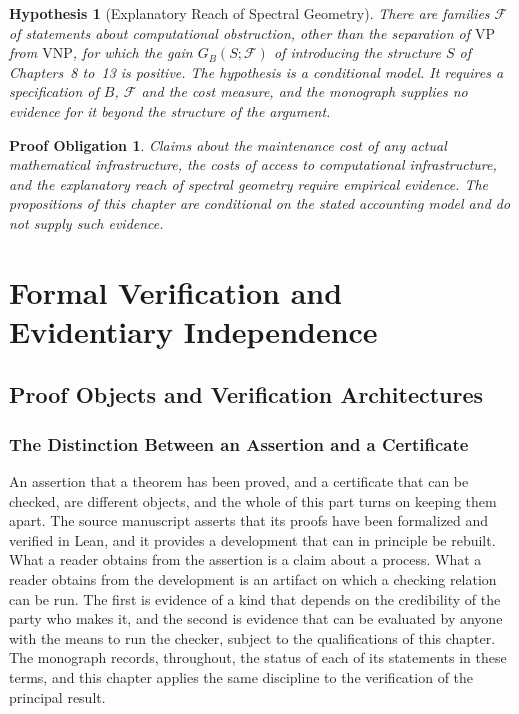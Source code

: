 \documentclass[11pt,letterpaper]{report}
\theoremstyle{plain}
\newtheorem{hypothesis}[theorem]{Hypothesis}
\newtheorem{obligation}[theorem]{Proof Obligation}
\theoremstyle{definition}
\theoremstyle{remark}
\newcommand{\VP}{\mathrm{VP}}
\newcommand{\VNP}{\mathrm{VNP}}
\begin{document}
\begin{hypothesis}[Explanatory Reach of Spectral Geometry]\label{hy:reach}
There are families $\mathcal F$ of statements about computational obstruction, other than the separation of $\VP$ from $\VNP$, for which the gain $G_B(S;\mathcal F)$ of introducing the structure $S$ of Chapters~8 to~13 is positive. The hypothesis is a conditional model. It requires a specification of $B$, $\mathcal F$ and the cost measure, and the monograph supplies no evidence for it beyond the structure of the argument.
\end{hypothesis}

\begin{obligation}\label{ob:infrastructure}
Claims about the maintenance cost of any actual mathematical infrastructure, the costs of access to computational infrastructure, and the explanatory reach of spectral geometry require empirical evidence. The propositions of this chapter are conditional on the stated accounting model and do not supply such evidence.
\end{obligation}

\part{Formal Verification and Evidentiary Independence}

\chapter{Proof Objects and Verification Architectures}

\section{The Distinction Between an Assertion and a Certificate}

An assertion that a theorem has been proved, and a certificate that can be checked, are different objects, and the whole of this part turns on keeping them apart. The source manuscript asserts that its proofs have been formalized and verified in Lean, and it provides a development that can in principle be rebuilt. What a reader obtains from the assertion is a claim about a process. What a reader obtains from the development is an artifact on which a checking relation can be run. The first is evidence of a kind that depends on the credibility of the party who makes it, and the second is evidence that can be evaluated by anyone with the means to run the checker, subject to the qualifications of this chapter. The monograph records, throughout, the status of each of its statements in these terms, and this chapter applies the same discipline to the verification of the principal result.
\end{document}
